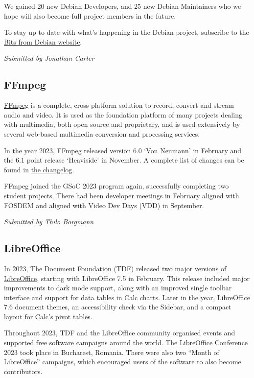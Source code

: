 \documentclass[a4paper]{report}
\begin{document}
We gained 20 new Debian Developers, and 25 new Debian Maintainers who we hope will also become full project members in the future.

To stay up to date with what's happening in the Debian project, subscribe to
the \href{https://bits.debian.org/}{Bits from Debian website}.

{\em Submitted by Jonathan Carter}

\subsection{FFmpeg}

\href{https://www.ffmpeg.org/}{FFmpeg} is a complete, cross-platform solution to record, convert and stream audio and video. It is used as the foundation platform of many projects dealing with multimedia, both open source and proprietary, and is used extensively by several web-based multimedia conversion and processing services.

In the year 2023, FFmpeg released version 6.0 `Von Neumann' in February and the 6.1 point release `Heaviside' in November. A complete list of changes can be found in \href{https://git.ffmpeg.org/gitweb/ffmpeg.git/blob/HEAD:/Changelog}{the changelog}.

FFmpeg joined the GSoC 2023 program again, successfully completing two student projects. There had been developer meetings in February aligned with FOSDEM and aligned with Video Dev Days (VDD) in September.

{\em Submitted by Thilo Borgmann}

\subsection{LibreOffice}

In 2023, The Document Foundation (TDF) released two major versions of \href{https://www.libreoffice.org/}{LibreOffice}, starting with LibreOffice 7.5 in February. This release included major improvements to dark mode support, along with an improved single toolbar interface and support for data tables in Calc charts. Later in the year, LibreOffice 7.6 document themes, an accessibility check via the Sidebar, and a compact layout for Calc's pivot tables.

Throughout 2023, TDF and the LibreOffice community organised events and supported free software campaigns around the world. The LibreOffice Conference 2023 took place in Bucharest, Romania. There were also two ``Month of LibreOffice'' campaigns, which encouraged users of the software to also become contributors.
\end{document}
